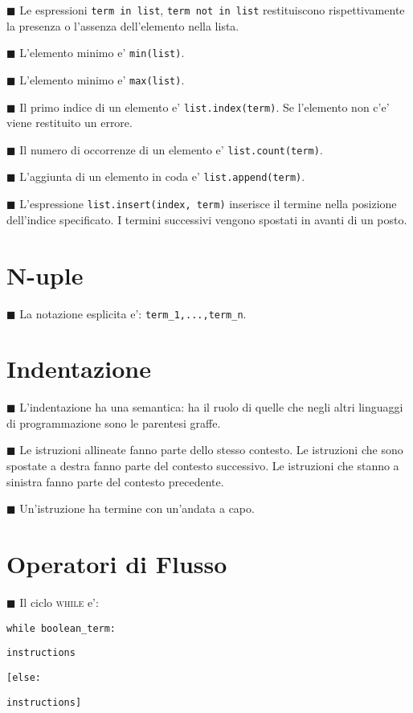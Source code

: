 \documentclass[a4paper,12pt,fleqn,leqno,twoside]{article}
\newcommand{\tw}{\texttt} %
\renewcommand{\sc}{\textsc} %
\newcommand{\bbox}{{\scriptsize $\blacksquare$}} %
\newcommand{\skipline}{\vspace{\baselineskip}} %
\newcommand{\bitem}[1]{\bbox \; #1\par \skipline}
\begin{document}
\bitem{Le espressioni \tw{term in list}, \tw{term not in list} restituiscono rispettivamente la presenza o l'assenza dell'elemento nella lista.}

\bitem{L'elemento minimo e' \tw{min(list)}.}

\bitem{L'elemento minimo e' \tw{max(list)}.}

\bitem{Il primo indice di un elemento e' \tw{list.index(term)}. Se l'elemento non c'e' viene restituito un errore.}

\bitem{Il numero di occorrenze di un elemento e' \tw{list.count(term)}.}

\bitem{L'aggiunta di un elemento in coda e' \tw{list.append(term)}.}

\bitem{L'espressione \tw{list.insert(index, term)} inserisce il termine nella posizione dell'indice specificato. I termini successivi vengono spostati in avanti di un posto.}

\section{N-uple}

\bitem{La notazione esplicita e': \tw{term\_1,...,term\_n}.}

\section{Indentazione}

\bitem{L'indentazione ha una semantica: ha il ruolo di quelle che negli altri linguaggi di programmazione sono le parentesi graffe.}

\bitem{Le istruzioni allineate fanno parte dello stesso contesto. Le istruzioni che sono spostate a destra fanno parte del contesto successivo. Le istruzioni che stanno a sinistra fanno parte del contesto precedente.}

\bitem{Un'istruzione ha termine con un'andata a capo.}

\section{Operatori di Flusso}

\bitem{Il ciclo \sc{while} e':}

\tw{while boolean\_term:}\par
\tw{\qquad instructions}\par
\tw{[else:}\par
\tw{\qquad instructions]}

\skipline
\end{document}
